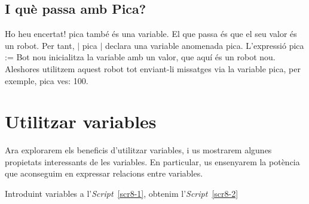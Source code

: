 \subsection{I què passa amb Pica?}
Ho heu encertat! \textsf{pica} també és una variable. El que passa és que el seu valor és un robot. Per tant, \textsf{$|$ pica $|$} declara una variable anomenada \textsf{pica}. L'expressió \textsf{pica := Bot nou} inicialitza la variable amb un valor, que aquí és un robot nou. Aleshores utilitzem aquest robot tot enviant-li missatges via la variable \textsf{pica}, per exemple, \textsf{pica ves: 100}.

\section{Utilitzar variables}
Ara explorarem els beneficis d'utilitzar variables, i us mostrarem algunes propietats interessants de les variables. En particular, us ensenyarem la potència que aconseguim en expressar relacions entre variables.

Introduint variables a  l'\emph{Script}~\ref{scr8-1}, obtenim  l'\emph{Script}~\ref{scr8-2}

